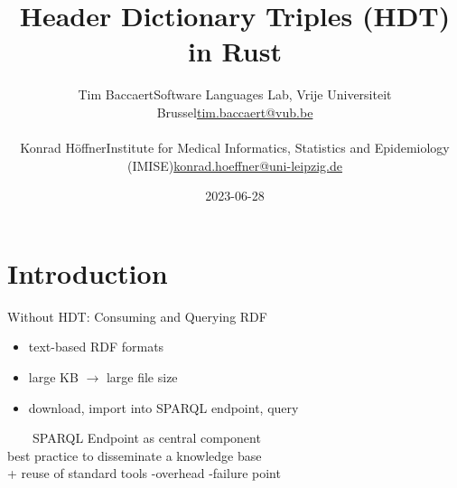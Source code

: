 \documentclass[14pt,aspectratio=169]{beamer}
\date{2023-06-28}
\author{
\small
\texorpdfstring{Tim Baccaert\newline{}Software Languages Lab, Vrije Universiteit Brussel\newline{}\url{tim.baccaert@vub.be}}{Tim Baccaert}\\~\\
\texorpdfstring{Konrad Höffner\newline{}Institute for Medical Informatics, Statistics and Epidemiology (IMISE)\newline{}\url{konrad.hoeffner@uni-leipzig.de}}{Konrad Höffner}
}
\title{Header Dictionary Triples (HDT) in Rust}
\subtitle{}
\newcommand{\imageslide}[4][]
{
\begin{frame}[plain]{~~~~#2}
\vspace{0.2em}
\centering\makebox[\linewidth]{\texttt{[image: \#3]}}
\\#1
\note{#4}
\end{frame}
}
\newcommand\pro{\item[$+$]}
\newcommand\con{\item[$-$]}
\begin{document}
\begin{frame}
\titlepage
\end{frame}

\section{Introduction}

\iffalse
\begin{frame}{Problem}
\enquote{
\ldots{}what the Semantic Web field most needs, at this stage, is consolidation\ldots
For \textbf{academics}, there is often limited incentive to develop and maintain \textbf{stable, easy-to-use software}\ldots
Consolidation of sorts is already happening in \textbf{industry}\ldots
Technical details\ldots{} are however \textbf{usually not shared}, presumably to protect the own competitive edge.
}
\\~\\
Pascal Hitzler: \emph{A Review of the Semantic Web Field}. 2021
\end{frame}
\fi

\begin{frame}{Without HDT: Consuming and Querying RDF}
\begin{itemize}
\item text-based RDF formats
\item large KB $\rightarrow$ large file size
\item download, import into SPARQL endpoint, query
\end{itemize}
\end{frame}

\imageslide[best practice to disseminate a knowledge base\\+ reuse of standard tools -overhead -failure point]
{SPARQL Endpoint as central component}{img/architecture.pdf}{}

\iffalse
\begin{frame}{SPARQL Endpoints}
\begin{itemize}
\pro Linked Open Data best practice
\pro standard RDF query language
\pro reuse of standard tools
\pro update graphs with SPARUL
\pause
\con overhead on small graphs
\con timeouts
\con downtimes
\con separate component: failure point, hard to integrate
\end{itemize}
\end{frame}
\fi
\end{document}
